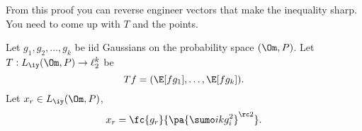 From this proof you can reverse engineer vectors that make the inequality sharp. You need to come up with $T$ and the points.

\begin{ex}
Let $g_1,g_2,\ldots,g_k $ be iid Gaussians on the probability space $(\Om, P)$. Let $T:L_{\iy}(\Om, P)\to \ell_2^k$ be %
\[
Tf = (\E[fg_1],\ldots, \E[fg_k]).
\]
Let $x_r \in L_{\iy} (\Om, P)$, 
\[
x_r = \fc{g_r}{\pa{\sumo ik g_i^2}^{\rc 2}}.
\]
\end{ex}
